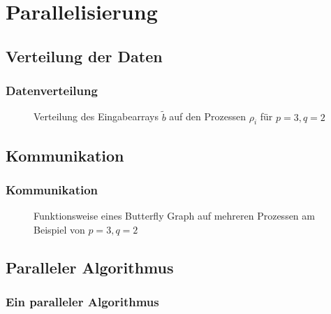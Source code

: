 \documentclass[aspectratio=169]{beamer}
\begin{document}


	\section{Parallelisierung} %
	\label{sec:parallelisierung}
	
		\subsection{Verteilung der Daten} %
		\label{sub:verteilung_der_daten}

			\begin{frame}
				\frametitle{Datenverteilung}
				\begin{figure}[h]
					\center
					
					\caption{Verteilung des Eingabearrays $\tilde{b}$ auf den Prozessen $\rho_i$ für $p=3,q=2$}
					\label{fig:data-distribution}
				\end{figure}
			\end{frame}
		

		\subsection{Kommunikation} %
		\label{sub:kommunikation}

			\begin{frame}
				\frametitle{Kommunikation}
				\begin{figure}[h]
					\center
					
					\caption{Funktionsweise eines Butterfly Graph auf mehreren Prozessen am Beispiel von $p=3,q=2$}
					\label{fig:butterfly-parallel}
				\end{figure}
			\end{frame}
		

		\subsection{Paralleler Algorithmus} %
		\label{sub:paralleler_algorithmus}

			\begin{frame}
				\frametitle{Ein paralleler Algorithmus}
				\begin{tcolorbox}[breakable, colframe=black,colbacktitle=white,coltitle=black,enhanced, titlerule=0.1pt, boxrule=0.5pt, attach boxed title to top center={yshift=-2mm},enhanced, arc=5pt,title=Listing:\quad paralleler FFT-Algorithmus Teil 1]
					\scriptsize
					
				\end{tcolorbox}
			\end{frame}
\end{document}
